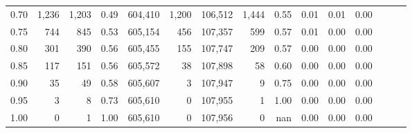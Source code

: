 \begin{tabular}{rrrrrrrrrrrrrrr}
0.70 &    1,236 &   1,203 &  0.49 &  604,410 &    1,200 &  106,512 &    1,444 &  0.55 &  0.01 &  0.01 &      0.00 \\
0.75 &      744 &     845 &  0.53 &  605,154 &      456 &  107,357 &      599 &  0.57 &  0.01 &  0.00 &      0.00 \\
0.80 &      301 &     390 &  0.56 &  605,455 &      155 &  107,747 &      209 &  0.57 &  0.00 &  0.00 &      0.00 \\
0.85 &      117 &     151 &  0.56 &  605,572 &       38 &  107,898 &       58 &  0.60 &  0.00 &  0.00 &      0.00 \\
0.90 &       35 &      49 &  0.58 &  605,607 &        3 &  107,947 &        9 &  0.75 &  0.00 &  0.00 &      0.00 \\
0.95 &        3 &       8 &  0.73 &  605,610 &        0 &  107,955 &        1 &  1.00 &  0.00 &  0.00 &      0.00 \\
1.00 &        0 &       1 &  1.00 &  605,610 &        0 &  107,956 &        0 &   nan &  0.00 &  0.00 &      0.00 \\
\bottomrule
\end{tabular}
